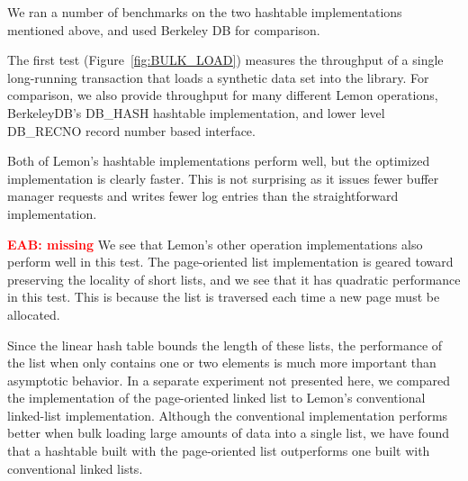 \documentclass[letterpaper,twocolumn,english]{article}
\newcommand{\yad}{Lemon\xspace}
\newcommand{\eab}[1]{\textcolor{red}{\bf EAB: #1}}
\begin{document}
We ran a number of benchmarks on the two hashtable implementations
mentioned above, and used Berkeley DB for comparison.


The first test (Figure~\ref{fig:BULK_LOAD}) measures the throughput of
a single long-running
transaction that loads a synthetic data set into the
library.  For comparison, we also provide throughput for many different
\yad operations, BerkeleyDB's DB\_HASH hashtable implementation,
and lower level DB\_RECNO record number based interface.  

Both of \yad's hashtable implementations perform well, but the
optimized implementation is clearly faster.  This is not surprising as
it issues fewer buffer manager requests and writes fewer log entries
than the straightforward implementation.

\eab{missing} We see that \yad's other operation implementations also
perform well in this test.  The page-oriented list implementation is
geared toward preserving the locality of short lists, and we see that
it has quadratic performance in this test.  This is because the list
is traversed each time a new page must be allocated.


Since the linear hash table bounds the length of these lists, the 
performance of the list when only contains one or two elements is
much more important than asymptotic behavior. In a separate experiment
not presented here, we compared the
implementation of the page-oriented linked list to \yad's conventional
linked-list implementation.  Although the conventional implementation
performs better when bulk loading large amounts of data into a single
list, we have found that a hashtable built with the page-oriented list
outperforms one built with 
conventional linked lists.
\end{document}
